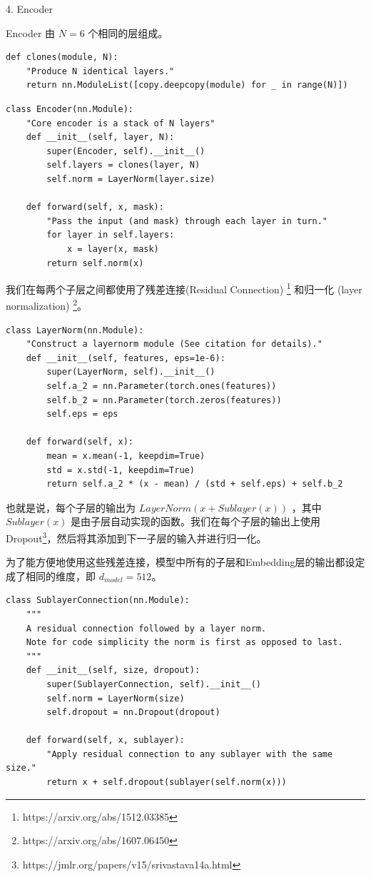 4. Encoder

Encoder 由 $N = 6$ 个相同的层组成。


\begin{Verbatim}
def clones(module, N):
    "Produce N identical layers."
    return nn.ModuleList([copy.deepcopy(module) for _ in range(N)])
\end{Verbatim}

\begin{Verbatim}
class Encoder(nn.Module):
    "Core encoder is a stack of N layers"
    def __init__(self, layer, N):
        super(Encoder, self).__init__()
        self.layers = clones(layer, N)
        self.norm = LayerNorm(layer.size)
        
    def forward(self, x, mask):
        "Pass the input (and mask) through each layer in turn."
        for layer in self.layers:
            x = layer(x, mask)
        return self.norm(x)
\end{Verbatim}

我们在每两个子层之间都使用了残差连接(Residual Connection) \footnote{https://arxiv.org/abs/1512.03385} 和归一化 (layer normalization) \footnote{https://arxiv.org/abs/1607.06450}。

\begin{Verbatim}
class LayerNorm(nn.Module):
    "Construct a layernorm module (See citation for details)."
    def __init__(self, features, eps=1e-6):
        super(LayerNorm, self).__init__()
        self.a_2 = nn.Parameter(torch.ones(features))
        self.b_2 = nn.Parameter(torch.zeros(features))
        self.eps = eps

    def forward(self, x):
        mean = x.mean(-1, keepdim=True)
        std = x.std(-1, keepdim=True)
        return self.a_2 * (x - mean) / (std + self.eps) + self.b_2
\end{Verbatim}

也就是说，每个子层的输出为 $LayerNorm(x + Sublayer(x))$ ，其中 $Sublayer(x)$ 是由子层自动实现的函数。我们在每个子层的输出上使用 Dropout\footnote{https://jmlr.org/papers/v15/srivastava14a.html}，然后将其添加到下一子层的输入并进行归一化。

为了能方便地使用这些残差连接，模型中所有的子层和Embedding层的输出都设定成了相同的维度，即 $d_{model} = 512$。

\begin{Verbatim}
class SublayerConnection(nn.Module):
    """
    A residual connection followed by a layer norm.
    Note for code simplicity the norm is first as opposed to last.
    """
    def __init__(self, size, dropout):
        super(SublayerConnection, self).__init__()
        self.norm = LayerNorm(size)
        self.dropout = nn.Dropout(dropout)

    def forward(self, x, sublayer):
        "Apply residual connection to any sublayer with the same size."
        return x + self.dropout(sublayer(self.norm(x)))
\end{Verbatim}

